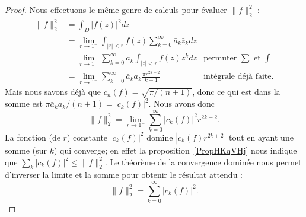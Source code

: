 \begin{proof}
	Nous effectuons le même genre de calculs pour évaluer \( \| f \|^2_2\) :
	\begin{subequations}
		\begin{align}
			\| f \|_2^2 & =\int_D| f(z) |^2dz                                                                                                \\
			            & =\lim_{r\to 1^-}\int_{| z |<r}f(z)\sum_{k=0}^{\infty}\bar a_k\bar z_kdz                                            \\
			            & =\lim_{r\to 1^-}\sum_{k=0}^{\infty}\bar a_k\int_{| z |<r}f(z)\bar z^kdz    & \text{permuter } \sum\text{ et } \int \\
			            & =\lim_{r\to 1^-}\sum_{k=0}^{\infty}\bar a_ka_k\frac{ \pi r^{2k+2} }{ k+1 } & \text{intégrale déjà faite}.
		\end{align}
	\end{subequations}
	Mais nous savons déjà que \( c_n(f)=\sqrt{\pi/(n+1)}\), donc ce qui est dans la somme est \( \pi\bar a_ka_k/(n+1)=| c_k(f) |^2\). Nous avons donc
	\begin{equation}
		\| f \|^2_2=\lim_{r\to 1^-}\sum_{k=0}^{\infty}| c_k(f) |^2 r^{2k+2}.
	\end{equation}
	La fonction (de \( r\)) constante \( | c_k(f) |^2\) domine \( | c_k(f)r^{2k+2} |\) tout en ayant une somme (sur \( k\)) qui converge; en effet la proposition~\ref{PropHKqVHj} nous indique que \( \sum_k| c_k(f) |^2\leq \| f \|_2^2\). Le théorème de la convergence dominée nous permet d'inverser la limite et la somme pour obtenir le résultat attendu :
	\begin{equation}
		\| f \|_2^2=\sum_{k=0}^{\infty}| c_k(f) |^2.
	\end{equation}
\end{proof}
